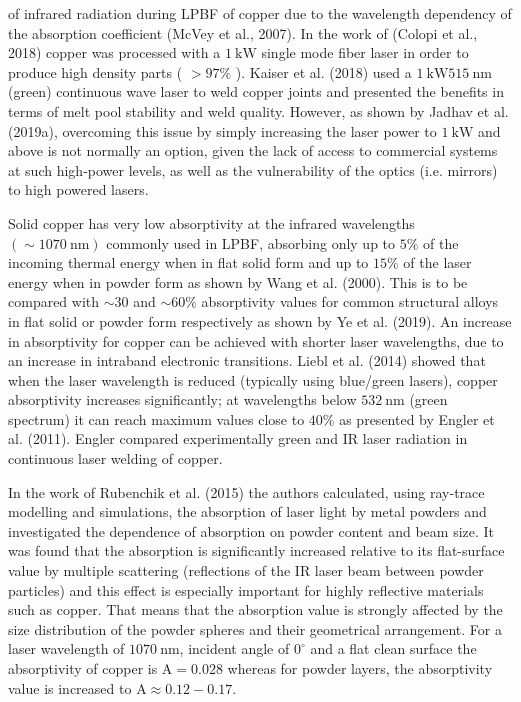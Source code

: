 \documentclass[10pt]{article}
\begin{document}
of infrared radiation during LPBF of copper due to the wavelength dependency of the absorption coefficient (McVey et al., 2007). In the work of (Colopi et al., 2018) copper was processed with a $1 \mathrm{~kW}$ single mode fiber laser in order to produce high density parts ( $>97 \%$ ). Kaiser et al. (2018) used a $1 \mathrm{~kW} 515 \mathrm{~nm}$ (green) continuous wave laser to weld copper joints and presented the benefits in terms of melt pool stability and weld quality. However, as shown by Jadhav et al. (2019a), overcoming this issue by simply increasing the laser power to $1 \mathrm{~kW}$ and above is not normally an option, given the lack of access to commercial systems at such high-power levels, as well as the vulnerability of the optics (i.e. mirrors) to high powered lasers.

Solid copper has very low absorptivity at the infrared wavelengths $(\sim 1070 \mathrm{~nm})$ commonly used in LPBF, absorbing only up to $5 \%$ of the incoming thermal energy when in flat solid form and up to $15 \%$ of the laser energy when in powder form as shown by Wang et al. (2000). This is to be compared with $\sim 30$ and $\sim 60 \%$ absorptivity values for common structural alloys in flat solid or powder form respectively as shown by Ye et al. (2019). An increase in absorptivity for copper can be achieved with shorter laser wavelengths, due to an increase in intraband electronic transitions. Liebl et al. (2014) showed that when the laser wavelength is reduced (typically using blue/green lasers), copper absorptivity increases significantly; at wavelengths below $532 \mathrm{~nm}$ (green spectrum) it can reach maximum values close to $40 \%$ as presented by Engler et al. (2011). Engler compared experimentally green and IR laser radiation in continuous laser welding of copper.

In the work of Rubenchik et al. (2015) the authors calculated, using ray-trace modelling and simulations, the absorption of laser light by metal powders and investigated the dependence of absorption on powder content and beam size. It was found that the absorption is significantly increased relative to its flat-surface value by multiple scattering (reflections of the IR laser beam between powder particles) and this effect is especially important for highly reflective materials such as copper. That means that the absorption value is strongly affected by the size distribution of the powder spheres and their geometrical arrangement. For a laser wavelength of $1070 \mathrm{~nm}$, incident angle of $0^{\circ}$ and a flat clean surface the absorptivity of copper is $\mathrm{A}=0.028$ whereas for powder layers, the absorptivity value is increased to $\mathrm{A} \approx 0.12-0.17$.
\end{document}
